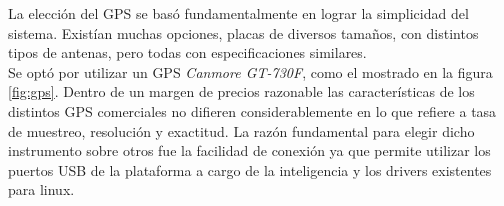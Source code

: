 \documentclass[main]{subfiles}
\begin{document}
La elecci\'on del GPS se bas\'o fundamentalmente en lograr la simplicidad del sistema. Exist\'ian muchas opciones, placas de diversos tama\~nos, con distintos tipos de antenas, pero todas con especificaciones similares.\\

Se opt\'o por utilizar un GPS \textit{Canmore GT-730F}, como el mostrado en la figura \ref{fig:gps}. Dentro de un margen de precios razonable las caracter\'isticas de los distintos GPS comerciales no difieren considerablemente en lo que refiere a tasa de muestreo, resoluci\'on y exactitud. La raz\'on fundamental para elegir dicho instrumento sobre otros fue la facilidad de conexi\'on ya que permite utilizar los puertos USB de la plataforma a cargo de la inteligencia y los drivers existentes para linux. \\ 
\end{document}
